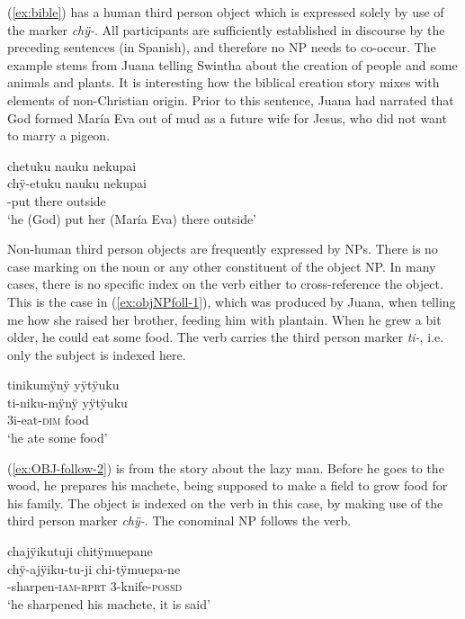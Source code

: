 (\ref{ex:bible}) has a human third person object which is expressed solely by use of the marker \textit{chÿ-}. All participants are sufficiently established in discourse by the preceding sentences (in Spanish), and therefore no NP needs to co-occur. The example stems from Juana telling Swintha about the creation of people and some animals and plants. It is interesting how the biblical creation story mixes with elements of non-Christian origin. Prior to this sentence, Juana had narrated that God formed María Eva out of mud as a future wife for Jesus, who did not want to marry a pigeon.

\ea\label{ex:bible}
\begingl
\glpreamble chetuku nauku nekupai\\
\gla chÿ-etuku nauku nekupai\\
-put there outside\\
\glft ‘he (God) put her (María Eva) there outside’
\endgl
\trailingcitation{[jxx-n101013s-1.359]}
\xe
{}

Non-human third person objects are frequently expressed by NPs. There is no case marking on the noun or any other constituent of the object NP. In many cases, there is no specific index on the verb either to cross-reference the object. This is the case in (\ref{ex:objNPfoll-1}), which was produced by Juana, when telling me how she raised her brother, feeding him with plantain. When he grew a bit older, he could eat some food. The verb carries the third person marker \textit{ti-}, i.e. only the subject is indexed here. 


\ea\label{ex:objNPfoll-1}
\begingl 
\glpreamble tinikumÿnÿ yÿtÿuku\\
\gla ti-niku-mÿnÿ yÿtÿuku\\ 
\glb 3i-eat-\textsc{dim} food\\ 
\glft ‘he ate some food’\\ 
\endgl
\trailingcitation{[jxx-p120430l-2.486]}
\xe

(\ref{ex:OBJ-follow-2}) is from the story about the lazy man. Before he goes to the wood, he prepares his machete, being supposed to make a field to grow food for his family. The object is indexed on the verb in this case, by making use of the third person marker \textit{chÿ-}. The conominal NP follows the verb.

\ea\label{ex:OBJ-follow-2}
\begingl 
\glpreamble chajÿikutuji chitÿmuepane\\
\gla chÿ-ajÿiku-tu-ji chi-tÿmuepa-ne\\
-sharpen-\textsc{iam}-\textsc{rprt} 3-knife-\textsc{possd}\\ 
\glft ‘he sharpened his machete, it is said’\\ 
\endgl
\trailingcitation{[mox-n110920l.021]}
\xe

